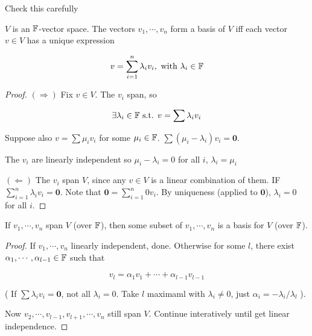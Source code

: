 \documentclass[a4paper]{article}
\begin{document}
\begin{ex}
	Check this carefully 
\end{ex}


\begin{lemma} 
	$ V $ is an $ \mathbb{F} $-vector space. The vectors $ v_{1}, \cdots, v_{n} $ form a basis of $ V $ iff each vector $ v \in V $ has a unique expression
	
	\[ v = \sum_{i=1}^{n} \lambda_{i}v_{i}, \text{ with } \lambda_{i} \in \mathbb{F} \] 
	
\end{lemma}

\begin{proof}
	$ (\Rightarrow) $ Fix $ v \in V$. The $ v_{i} $ span, so 
	
	\[ \exists \lambda_{i} \in \mathbb{F} \text{ s.t. } v = \sum \lambda_{i} v_{i} \]
	
	Suppose also $ v = \sum \mu_{i} v_{i} $ for some $ \mu_{i} \in \mathbb{F} $. $ \sum \left( \mu_{i} - \lambda_{i} \right)  v_{i} = \mathbf{0} $.
	
	The $ v_{i} $ are linearly independent so $ \mu_{i} - \lambda_{i} = 0 $ for all $ i $, $ \lambda_{i} = \mu_{i} $
	
	
	$ (\Leftarrow) $ The $ v_{i} $ span $ V $, since any $ v \in V $ is a linear combination of them.
	IF $ \sum_{i=1}^{n} \lambda_{i} v_{i} = \mathbf{0} $. Note that $ \mathbf{0} = \sum_{i=1}^{n} 0 v_{i} $. By uniqueness (applied to $ \mathbf{0} $), $ \lambda_{i}  = 0 $ for all $ i $. 
\end{proof} 


\begin{lemma} 
	If $ v_{1},\cdots,v_{n} $ span $ V $ (over $ \mathbb{F} $), then some subset of $ v_{1},\cdots,v_{n} $ is a basis for $ V $ (over $ \mathbb{F} $).	
\end{lemma}

\begin{proof}
		If $ v_{1},\cdots,v_{n} $ linearly independent, done.
		Otherwise for some $ l $, there exist $ \alpha_{1},\cdots,\alpha_{l-1} \in \mathbb{F} $ such that
		
		\[ v_{l} = \alpha_{1} v_{1} + \cdots + \alpha_{l-1}v_{l-1} \]
		
		
		( If $ \sum \lambda_{i} v_{i} = \mathbf{0}$, not all $ \lambda_{i} = 0 $. Take $ l $ maximaml with $ \lambda_{i} \neq  0$, just $ \alpha_{i} = - \lambda_{i} / \lambda_{l} $ ).
		
		Now $ v_{2}, \cdots, v_{l-1},v_{l+1},\cdots,v_{n} $ still span $ V $. Continue interatively until get linear independence. 
		
\end{proof}
\end{document}
